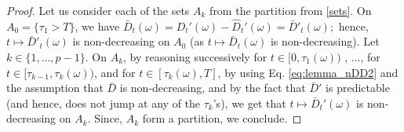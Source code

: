 \documentclass[11pt,a4paper]{article}
\numberwithin{equation}{section}
\theoremstyle{newPlain}
\theoremstyle{newDefinition}
\theoremstyle{newRemark}
\begin{document}
\begin{appendices}
\begin{proof}
Let us consider each of the sets $A_k$ from the partition from \eqref{sets}.  On $A_0=\{\tau_1>T\}$,  
 we have $\bar{D}_t(\omega) = D_t'(\omega)-\hat{D}_t'(\omega)=\bar{D}'_t(\omega);$ hence, $t\mapsto \bar{D}'_t(\omega)$ is non-decreasing on  $A_0$ (as $t\mapsto \bar{D}_t(\omega)$ is non-decreasing). 
Let $k\in\{1,\ldots,p-1\}$. On $A_k$, by reasoning successively for $t\in[0,\tau_1(\omega))$ , ..., for $t\in[\tau_{k-1},\tau_k(\omega))$, and for $t\in[\tau_k(\omega),T]$,  by using Eq. \eqref{eq:lemma_nDD2} and the assumption that $\bar D$ is non-decreasing,  and by the fact that $\bar D'$ is predictable (and hence, does not jump at any of the $\tau_k$'s), we get that  $t\mapsto \bar{D}_t'(\omega)$ is non-decreasing on $A_k$. Since, $A_k$ form a partition, we conclude.   
\end{proof}


\end{appendices}
\end{document}
